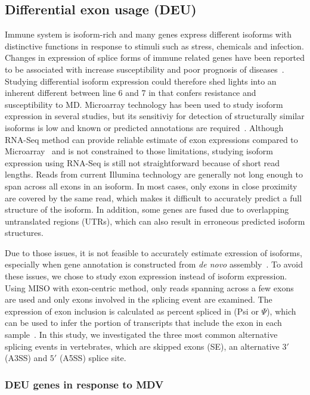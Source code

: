 \documentclass[10pt]{article}
\begin{document}
\subsection*{Differential exon usage (DEU)}

Immune system is isoform-rich and many genes express different isoforms with distinctive functions in response to
stimuli such as stress, chemicals and infection.
Changes in expression of splice forms of immune related genes have been reported to be associated with increase
susceptibility and poor prognosis of diseases~\cite{lynch2004consequences}.
Studying differential isoform expression could therefore shed lights into an inherent different between 
line 6 and 7 in that confers resistance and susceptibility to MD.
Microarray technology has been used to study isoform expression in several studies, but
its sensitiviy for detection of structurally similar isoforms is low and known or predicted annotations
are required~\cite{kane2000assessment}.
Although RNA-Seq method can provide reliable estimate of exon expressions compared to Microarray~\cite{pan2008deep}
and is not constrained to those limitations, studying isoform
expression using RNA-Seq is still not straightforward because of short read lengths.
Reads from current Illumina technology are generally not long enough to span across all exons in an isoform.
In most cases, only exons in close proximity are covered by the same read, which makes it
difficult to accurately predict a full structure of the isoform.
In addition, some genes are fused due to overlapping untranslated regions (UTRs),
which can also result in erroneous predicted isoform structures.

Due to those issues, it is not feasible to accurately estimate exression of isoforms, especially when
gene annotation is constructed from \textit{de novo} assembly~\cite{trapnell2013differential}.
To avoid these issues, we chose to study exon expression instead of isoform expression.
Using MISO with exon-centric method, only reads spanning across a few exons are used and only exons
involved in the splicing event are examined.
The expression of exon inclusion is calculated as percent spliced in (Psi or $\Psi$), which can be used to
infer the portion of transcripts that include the exon in each sample~\cite{Katz:2010iv}.
In this study, we investigated the three most common alternative splicing events in vertebrates, which are skipped
exons (SE), an alternative $3\prime$ (A3SS) and $5\prime$ (A5SS) splice site.

\subsubsection*{DEU genes in response to MDV}
\end{document}
